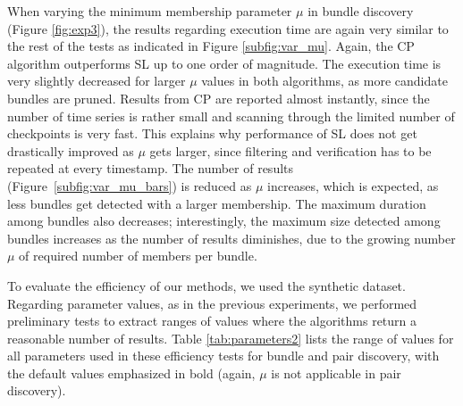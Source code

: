 When varying the minimum membership parameter $\mu$ in bundle discovery (Figure \ref{fig:exp3}), the results regarding execution time are again very similar to the rest of the tests as indicated in Figure \ref{subfig:var_mu}. Again, the CP algorithm outperforms SL up to one order of magnitude. The execution time is very slightly decreased for larger $\mu$ values in both algorithms, as more candidate bundles are pruned. Results from CP are reported almost instantly, since the number of time series is rather small and scanning through the limited number of checkpoints is very fast. This explains why performance of SL does not get drastically improved as $\mu$ gets larger, since filtering and verification has to be repeated at every timestamp. The number of results (Figure~\ref{subfig:var_mu_bars}) is reduced as $\mu$ increases, which is expected, as less bundles get detected with a larger membership. The maximum duration among bundles also decreases; interestingly, the maximum size detected among bundles increases as the number of results diminishes, due to the growing number $\mu$ of required number of members per bundle.

\label{subsubsec:effic}
To evaluate the efficiency of our methods, we used the synthetic dataset. Regarding parameter values, as in the previous experiments, we performed preliminary tests to extract ranges of values where the algorithms return a reasonable number of results. Table \ref{tab:parameters2} lists the range of values for all parameters used in these efficiency tests for bundle and pair discovery, with the default values emphasized in bold (again, $\mu$ is not applicable in pair discovery).

